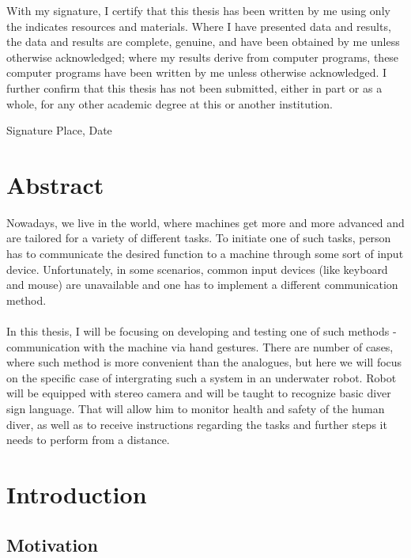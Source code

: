 \documentclass[a4paper,11pt,oneside]{article}
\begin{document}
  With my signature, I certify that this thesis has been written by me
  using only the indicates resources and materials. Where I have
  presented data and results, the data and results are complete,
  genuine, and have been obtained by me unless otherwise acknowledged;
  where my results derive from computer programs, these computer
  programs have been written by me unless otherwise acknowledged. I
  further confirm that this thesis has not been submitted, either in
  part or as a whole, for any other academic degree at this or another
  institution.

  \vspace{20mm}

  Signature \hfill Place, Date

  \newpage

  \section*{Abstract}
  
  Nowadays, we live in the world, where machines get more and more advanced and are tailored for a variety of different tasks. To initiate one of such tasks, person has to communicate the desired function to a machine through some sort of input device. Unfortunately, in some scenarios, common input devices (like keyboard and mouse) are unavailable and one has to implement a different communication method.\\
  \\
  In this thesis, I will be focusing on developing and testing one of such methods - communication with the machine via hand gestures. There are number of cases, where such method is more convenient than the analogues, but here we will focus on the specific case of intergrating such a system in an underwater robot. Robot will be equipped with stereo camera and will be taught to recognize basic diver sign language. That will allow him to monitor health and safety of the human diver, as well as to receive instructions regarding the tasks and further steps it needs to perform from a distance. 

  \newpage
  \tableofcontents

  \clearpage

  \section{Introduction}
  
  \subsection{Motivation}
  
\end{document}
